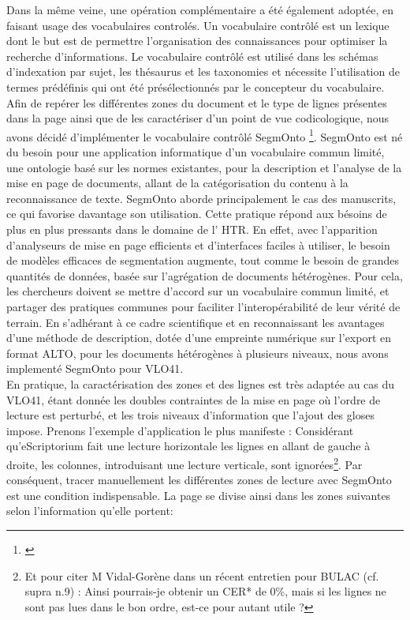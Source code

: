 \documentclass[a4paper, twoside, 12pt]{book}
\begin{document}
Dans la même veine, une opération complémentaire a été également adoptée, en faisant usage des vocabulaires controlés.
Un vocabulaire contrôlé est un lexique dont le but est de permettre l'organisation des connaissances pour optimiser la recherche d'informations. Le vocabulaire contrôlé est utilisé dans les schémas d'indexation par sujet, les thésaurus et les taxonomies et nécessite l'utilisation de termes prédéfinis qui ont été présélectionnés par le concepteur du vocabulaire.  Afin de repérer les différentes zones du document et le type de lignes présentes dans la page ainsi que de les caractériser d'un point de vue codicologique, nous avons décidé d'implémenter le vocabulaire contrôlé SegmOnto \footnote{\cite{gabay2021segmonto}}. SegmOnto est né du besoin pour une application informatique d'un vocabulaire commun limité, une ontologie basé sur les normes existantes, pour la description et l'analyse de la mise en page de documents, allant de la catégorisation du contenu à la reconnaissance de texte. SegmOnto aborde principalement le cas des manuscrits, ce qui favorise davantage son utilisation. Cette pratique répond aux bésoins de plus en plus pressants dans le domaine de l' HTR. En effet, avec l'apparition d'analyseurs de mise en page eﬀicients et d'interfaces faciles à utiliser, le besoin de modèles efficaces de segmentation augmente, tout comme le besoin de grandes quantités de données, basée sur l'agrégation de documents hétérogènes. Pour cela, les chercheurs doivent se mettre d'accord sur un vocabulaire commun limité, et partager des pratiques communes pour faciliter l'interopérabilité de leur vérité de terrain. En s'adhérant à ce cadre scientifique et en reconnaissant les avantages d'une méthode de description, dotée d'une empreinte numérique sur l'export en format ALTO, pour les documents hétérogènes à plusieurs niveaux, nous avons implementé SegmOnto pour VLO41.\\

En pratique, la caractérisation des zones et des lignes est très adaptée au cas du VLO41, étant donnée les doubles contraintes de la mise en page où l'ordre de lecture est perturbé, et les trois niveaux d'information que l'ajout des gloses impose. Prenons l'exemple d'application le plus manifeste : Considérant qu'eScriptorium fait une lecture horizontale les lignes en allant de gauche à droite, les colonnes, introduisant une lecture verticale, sont ignorées\footnote{Et pour citer M  Vidal-Gorène dans un récent entretien pour BULAC (cf. supra n.9) : \og{} Ainsi pourrais-je obtenir un CER* de 0\%, mais si les lignes ne sont pas lues dans le bon
ordre, est-ce pour autant utile ?\fg{} }. Par conséquent, tracer manuellement les différentes \og{} zones de lecture \fg{} avec SegmOnto est une condition indispensable. La page se divise ainsi dans les zones suivantes selon l'information qu'elle portent:
\end{document}
